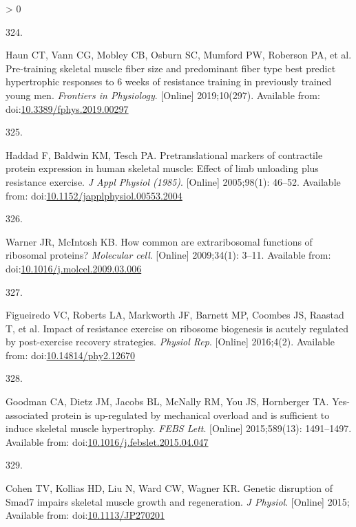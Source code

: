 \documentclass[twoside,10pt]{gihclass} %
\newlength{\cslhangindent}
\newlength{\csllabelwidth}
\newenvironment{CSLReferences}[3] %
 {%
  \setlength{\parindent}{0pt}
  \ifodd #1 \everypar{\setlength{\hangindent}{\cslhangindent}}\ignorespaces\fi
  \ifnum #2 > 0
  \setlength{\parskip}{#2\baselineskip}
  \fi
 }%
 {}
\newcommand{\CSLLeftMargin}[1]{\parbox[t]{\maxof{\widthof{#1}}{\csllabelwidth}}{#1}}
\newcommand{\CSLRightInline}[1]{\parbox[t]{\linewidth}{#1}}
\begin{document}
\begin{CSLReferences}{0}{0}
\leavevmode\hypertarget{ref-RN2225}{}%
\CSLLeftMargin{324. }
\CSLRightInline{Haun CT, Vann CG, Mobley CB, Osburn SC, Mumford PW, Roberson PA, et al. Pre-training skeletal muscle fiber size and predominant fiber type best predict hypertrophic responses to 6 weeks of resistance training in previously trained young men. \emph{Frontiers in Physiology}. {[}Online{]} 2019;10(297). Available from: doi:\href{https://doi.org/10.3389/fphys.2019.00297}{10.3389/fphys.2019.00297}}

\leavevmode\hypertarget{ref-RN2180}{}%
\CSLLeftMargin{325. }
\CSLRightInline{Haddad F, Baldwin KM, Tesch PA. Pretranslational markers of contractile protein expression in human skeletal muscle: Effect of limb unloading plus resistance exercise. \emph{J Appl Physiol (1985)}. {[}Online{]} 2005;98(1): 46--52. Available from: doi:\href{https://doi.org/10.1152/japplphysiol.00553.2004}{10.1152/japplphysiol.00553.2004}}

\leavevmode\hypertarget{ref-RN2588}{}%
\CSLLeftMargin{326. }
\CSLRightInline{Warner JR, McIntosh KB. How common are extraribosomal functions of ribosomal proteins? \emph{Molecular cell}. {[}Online{]} 2009;34(1): 3--11. Available from: doi:\href{https://doi.org/10.1016/j.molcel.2009.03.006}{10.1016/j.molcel.2009.03.006}}

\leavevmode\hypertarget{ref-RN1746}{}%
\CSLLeftMargin{327. }
\CSLRightInline{Figueiredo VC, Roberts LA, Markworth JF, Barnett MP, Coombes JS, Raastad T, et al. Impact of resistance exercise on ribosome biogenesis is acutely regulated by post-exercise recovery strategies. \emph{Physiol Rep}. {[}Online{]} 2016;4(2). Available from: doi:\href{https://doi.org/10.14814/phy2.12670}{10.14814/phy2.12670}}

\leavevmode\hypertarget{ref-RN1931}{}%
\CSLLeftMargin{328. }
\CSLRightInline{Goodman CA, Dietz JM, Jacobs BL, McNally RM, You JS, Hornberger TA. Yes-associated protein is up-regulated by mechanical overload and is sufficient to induce skeletal muscle hypertrophy. \emph{FEBS Lett}. {[}Online{]} 2015;589(13): 1491--1497. Available from: doi:\href{https://doi.org/10.1016/j.febslet.2015.04.047}{10.1016/j.febslet.2015.04.047}}

\leavevmode\hypertarget{ref-RN1619}{}%
\CSLLeftMargin{329. }
\CSLRightInline{Cohen TV, Kollias HD, Liu N, Ward CW, Wagner KR. Genetic disruption of Smad7 impairs skeletal muscle growth and regeneration. \emph{J Physiol}. {[}Online{]} 2015; Available from: doi:\href{https://doi.org/10.1113/JP270201}{10.1113/JP270201}}


\end{CSLReferences}
\end{document}
